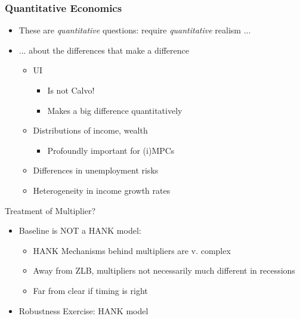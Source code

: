\documentclass[pdflatex,aspectratio=169]{beamer}
\begin{document}
\begin{frame}
  \frametitle{Quantitative Economics}
  \begin{itemize}[<+->]
    \item These are \textit{quantitative} questions: require \textit{quantitative} realism ...
    \item ... about the differences that make a difference
    \begin{itemize}[<+->]
    \item UI
      \begin{itemize}[<+->]
      \item Is not Calvo!
        \item Makes a big difference quantitatively
      \end{itemize}
    \item Distributions of income, wealth
      \begin{itemize}
      \item Profoundly important for (i)MPCs
      \end{itemize} 
      \item Differences in unemployment risks
      \item Heterogeneity in income growth rates
  \end{itemize}
\end{itemize}

\pause Treatment of Multiplier?

\begin{itemize}[<+->]
  \item Baseline is NOT a HANK model:
    \begin{itemize}[<+->]
    \item HANK Mechanisms behind multipliers are v. complex
    \item Away from ZLB, multipliers not necessarily much different in recessions
    \item Far from clear if timing is right
    \end{itemize}
  \end{itemize}
  
  \begin{itemize}[<+->]
    \itemsep = .25\bigskipamount 
    \item Robustness Exercise: HANK model 
    \end{itemize}
\end{frame}
\end{document}

